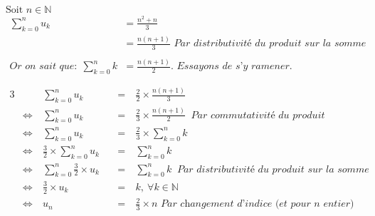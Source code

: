 \documentclass[a4paper,fleqn]{article}
\begin{document}
$\text{Soit } n \in \mathbb{N}$
\begin{align*}
    \sum_{k=0}^{n} u_k                         & = \frac{n^2+n}{3}                                                      \\
                                               & = \frac{n(n+1)}{3}\textit{ Par distributivité du produit sur la somme} \\ \\
    \textit{Or on sait que:}~~\sum_{k=0}^{n} k & = \frac{n(n+1)}{2}\textit{. Essayons de s'y ramener.}                  \\ \\
\end{align*}
\vspace{-1cm}
\begin{alignat*}{3}
     &                  & \sum_{k=0}^{n} u_k                   &  & ~=~ & \frac{2}{2}\times\frac{n (n+1)}{3}                                       \\
     & \Leftrightarrow~ & \sum_{k=0}^{n} u_k                   &  & ~=~ & \frac{2}{3}\times\frac{n(n+1)}{2}~\textit{ Par commutativité du produit} \\
     & \Leftrightarrow~ & \sum_{k=0}^{n} u_k                   &  & ~=~ & \frac{2}{3}\times\sum_{k=0}^{n} k                                        \\
     & \Leftrightarrow~ & \frac{3}{2}\times\sum_{k=0}^{n} u_k  &  & ~=~ & \sum_{k=0}^{n} k                                                         \\
     & \Leftrightarrow~ & \sum_{k=0}^{n} \frac{3}{2}\times u_k &  & ~=~ & \sum_{k=0}^{n} k~\textit{ Par distributivité du produit sur la somme}    \\
     & \Leftrightarrow~ & \frac{3}{2}\times u_k                &  & ~=~ & k,~\forall k \in \mathbb{N}                                              \\
     & \Leftrightarrow~ & u_n                                  &  & ~=~ & \frac{2}{3}\times n\textit{ Par changement d'indice (et pour n entier)}  \\
\end{alignat*}
\end{document}
